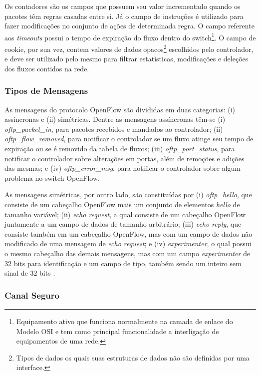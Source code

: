 \documentclass[12pt]{article}
\begin{document}
Os contadores são os campos que possuem seu valor incrementado quando os pacotes têm regras casadas entre si. Já o campo de instruções é utilizado para fazer modificações no conjunto de ações de determinada regra. O campo referente aos \textit{timeouts} possui o tempo de expiração do fluxo dentro do switch\footnote{Equipamento ativo que funciona normalmente na camada de enlace do Modelo OSI e tem como principal funcionalidade a interligação de equipamentos de uma rede.}. O campo de cookie, por sua vez, contem valores de dados opacos\footnote{Tipos de dados os quais suas estruturas de dados não são definidas por uma interface.} escolhidos pelo controlador, e deve ser utilizado pelo mesmo para filtrar estatísticas, modificações e deleções dos fluxos contidos na rede.

\subsubsection{Tipos de Mensagens}
As mensagens do protocolo OpenFlow são divididas em duas categorias: (i) assíncronas e (ii) simétricas. Dentre as mensagens assíncronas têm-se (i) \textit{oftp\_packet\_in}, para pacotes recebidos e mandados ao controlador; (ii) \textit{oftp\_flow\_removed}, para notificar o controlador se um fluxo atinge seu tempo de expiração ou se é removido da tabela de fluxos; (iii) \textit{oftp\_port\_status}, para notificar o controlador sobre alterações em portas, além de remoções e adições das mesmas; e (iv) \textit{oftp\_error\_msg}, para notificar o controlador sobre algum problema no switch OpenFlow.

As mensagens simétricas, por outro lado, são constituídas por (i) \textit{oftp\_hello}, que consiste de um cabeçalho OpenFlow mais um conjunto de elementos \textit{hello} de tamanho variável; (ii) \textit{echo request}, a qual consiste de um cabeçalho OpenFlow juntamente a um campo de dados de tamanho arbitrário; (iii) \textit{echo reply}, que consiste também em um cabeçalho OpenFlow, mas com um campo de dados não modificado de uma mensagem de \textit{echo request}; e (iv) \textit{experimenter}, o qual possui o mesmo cabeçalho das demais mensagens, mas com um campo \textit{experimenter} de 32 bits para identificação e um campo de tipo, também sendo um inteiro sem sinal de 32 bits \cite{654135}.

\subsubsection{Canal Seguro}
\end{document}
